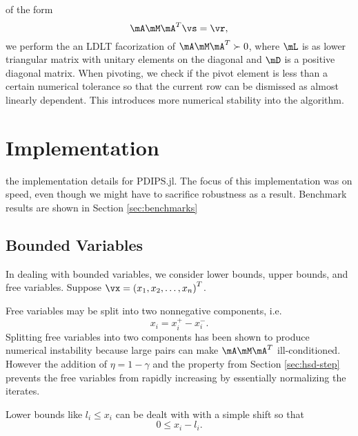 \documentclass[titlepage]{abhi-tufte-handout}
\begin{document}
 of the form
\[ \mA\mM\mA^T \vs = \vr, \]
we perform the an LDLT facorization of \(\mA\mM\mA^T \succ 0\), where \(\mL\)
is as lower triangular matrix with unitary elements on the diagonal and \(\mD\)
is a positive diagonal matrix. When pivoting, we check if the pivot element is
less than a certain numerical tolerance so that the current row can be dismissed
as almost linearly dependent. This introduces more numerical stability into the
algorithm.\cite{XuHungYe1996}

\section{Implementation}\label{sec:implementation}
 the implementation details for PDIPS.jl. The
focus of this implementation was on speed, even though we might have to
sacrifice robustness as a result.
Benchmark results are shown in Section \ref{sec:benchmarks}

\subsection{Bounded Variables}\label{sec:bounded-vars}
In dealing with bounded variables, we consider lower bounds, upper bounds, and
free variables. Suppose \(\vx = \left(x_1, x_2, \ldots, x_n\right)^T\).

Free variables may be split into two nonnegative components, i.e.
\[ x_i = x_i^+ - x_i^-.\]
Splitting free variables into two components has been shown to produce numerical
instability because large pairs can make \(\mA\mM\mA^T\) ill-conditioned.
However the addition of \(\eta = 1 - \gamma\) and the property from
Section \ref{sec:hsd-step} prevents the free variables from rapidly
increasing by essentially normalizing the iterates.

Lower bounds like \(l_i \leq x_i\) can be dealt with with a simple shift so that
\[ 0 \leq x_i - l_i. \]
\end{document}
